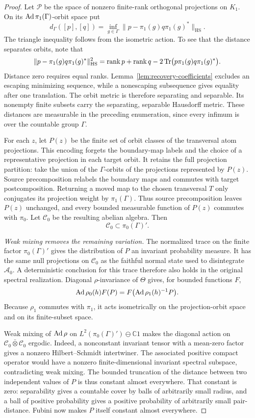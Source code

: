 \begin{proof}
Let $\mathcal P$ be the space of nonzero finite-rank orthogonal
projections on $K_1$.  On its $\operatorname{Ad}\pi_1(\Gamma)$-orbit space put
\[
 d_\Gamma([p],[q])
   =\inf_{g\in\Gamma}
       \|p-\pi_1(g)q\pi_1(g)^*\|_{\mathrm{HS}}.
\]
The triangle inequality follows from the isometric action.  To see that
the distance separates orbits, note that
\[
 \|p-\pi_1(g)q\pi_1(g)^*\|_{\mathrm{HS}}^2
 =\operatorname{rank} p+\operatorname{rank} q-2\operatorname{Tr}\bigl(p\pi_1(g)q\pi_1(g)^*\bigr).
\]
Distance zero requires equal ranks.  Lemma~\ref{lem:recovery-coefficients}
excludes an escaping minimizing sequence, while a nonescaping
subsequence gives equality after one translation.  The orbit metric is
therefore separating and separable.  Its nonempty finite subsets carry
the separating, separable Hausdorff metric.  These distances are
measurable in the preceding enumeration, since every infimum is over
the countable group $\Gamma$.

For each $z$, let $P(z)$ be the finite set of orbit classes of the
transversal atom projections.  This encoding forgets the boundary-map
labels and the choice of a representative projection in each target
orbit.  It retains the full projection partition: take the union of the
$\Gamma$-orbits of the projections represented by $P(z)$.
Source precomposition relabels the boundary maps and commutes with
target postcomposition. Returning a moved map to the chosen transversal
$T$ only conjugates its projection weight by $\pi_1(\Gamma)$.
Thus source precomposition leaves $P(z)$ unchanged, and every bounded
measurable function of $P(z)$ commutes with $\pi_0$.  Let $\mathcal C_0$ be the resulting
abelian algebra.  Then
\[
 \mathcal C_0\subset\pi_0(\Gamma)'.
\]

\emph{Weak mixing removes the remaining variation.}
The normalized trace on the finite factor $\pi_0(\Gamma)'$ gives the
distribution of $P$ an invariant probability measure.  It has the same
null projections on $\mathcal C_0$ as the faithful normal state used to
disintegrate $\mathcal A_0$.  A deterministic conclusion for this trace
therefore also holds in the original spectral realization.
Diagonal $\rho$-invariance of $\Theta$ gives, for bounded functions $F$,
\[
 \operatorname{Ad}\rho_0(h)F(P)
    =F\bigl(\operatorname{Ad}\rho_1(h)^{-1}P\bigr).
\]
Because $\rho_1$ commutes with $\pi_1$, it acts isometrically on the
projection-orbit space and on its finite-subset space.

Weak mixing of $\operatorname{Ad}\rho$ on
$L^2(\pi_0(\Gamma)')\ominus\mathbb C1$ makes the diagonal action on
$\mathcal C_0\bar\otimes\mathcal C_0$ ergodic.  Indeed, a nonconstant
invariant tensor with a mean-zero factor gives a nonzero Hilbert--Schmidt
intertwiner.  The associated positive compact operator would have a
nonzero finite-dimensional invariant spectral subspace, contradicting
weak mixing.  The bounded truncation of the distance between two
independent values of $P$ is thus constant almost everywhere.  That
constant is zero: separability gives a countable cover by balls of
arbitrarily small radius, and a ball of positive probability gives a
positive probability of arbitrarily small pair-distance.  Fubini now
makes $P$ itself constant almost everywhere.


\end{proof}

